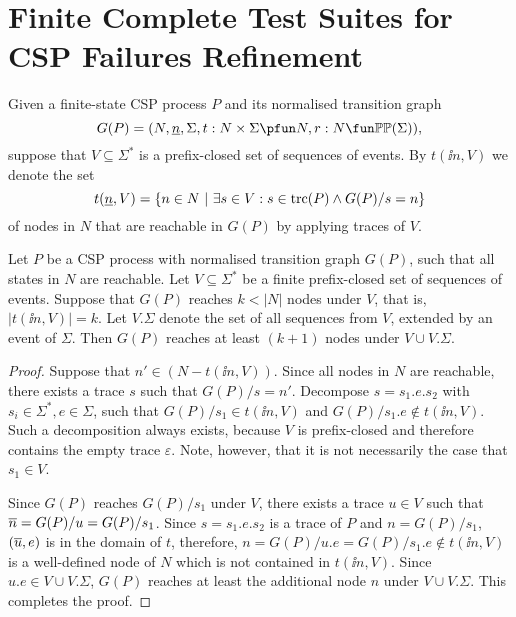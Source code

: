 \section{Finite Complete Test Suites for CSP Failures Refinement}
\label{sec:finitecompletefails}



Given a finite-state CSP process $P$ and its normalised transition graph 
\[
G(P) = ( N, \ii n, \Sigma, t : N\times\Sigma \pfun N, r : N \fun \mathbb{P}\mathbb{P}(\Sigma)),
\]
suppose that $V\subseteq\Sigma^*$ is a 
prefix-closed set  of sequences of events. By $t(\ii n,V)$ we denote the set
\[
t(\underline{n},V) = \{ n\in N~|~\exists s\in V: s\in\text{trc}(P)\wedge G(P)/s = n \}
\] 
of nodes in $N$ that are reachable in $G(P)$ by applying traces of $V$.

\begin{lemma}
\label{lemma:extendV}
Let $P$ be a CSP process with normalised transition graph $G(P)$, 
such that all states in $N$ are reachable.
Let $V\subseteq\Sigma^*$ be a finite prefix-closed set of
sequences of events. Suppose that  $G(P)$ reaches $k < |N|$ nodes under $V$, that is,
$|t(\ii n,V)| = k$. Let $V.\Sigma$ denote the set of all sequences from $V$, extended by an event of $\Sigma$.
Then $G(P)$ reaches at least $(k+1)$ nodes under $V\cup V.\Sigma$.
\end{lemma}
\begin{proof}
Suppose that $n'\in (N - t(\ii n,V))$.  Since all nodes in $N$ are reachable, there exists
a trace $s$ such that $G(P)/s = n'$. Decompose $s = s_1.e.s_2$ with $s_i\in\Sigma^*, e\in\Sigma$, such that $G(P)/s_1 \in t(\ii n,V)$ and $G(P)/s_1.e \not\in t(\ii n,V)$. Such a decomposition always exists, because $V$ is prefix-closed and therefore contains the empty trace $\varepsilon$. Note, however, that it is not necessarily the case that $s_1\in V$.

Since $G(P)$ reaches $G(P)/s_1$ under $V$, there exists a trace $u\in V$ such that
$\overline n = G(P)/u = G(P)/s_1$. Since $s = s_1.e.s_2$ is a trace of $P$ and $n = G(P)/s_1$,
$(\overline u,e)$ is in the domain of $t$, therefore,  
$n = G(P)/u.e = G(P)/s_1.e \not\in t(\ii n,V)$ is a well-defined node
of $N$ which is not contained in $t(\ii n,V)$. Since $u.e\in V\cup V.\Sigma$,
$G(P)$ reaches at least the additional node $n$ under $V\cup V.\Sigma$. This completes the proof.
\xbox
\end{proof}














